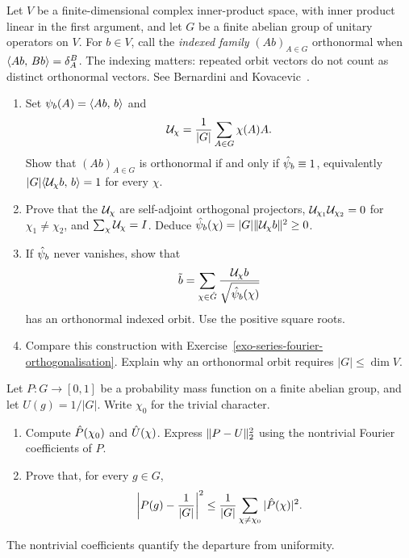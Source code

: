 
\begin{exo}
\label{exo-orthogonalization-abelian-group}
Let $V$ be a finite-dimensional complex inner-product space, with inner
product linear in the first argument, and let $G$ be a finite abelian group
of unitary operators on $V$. For $b\in V$, call the \emph{indexed family}
$(Ab)_{A\in G}$ orthonormal when $\langle Ab,\,Bb\rangle=\delta_A^B$.
The indexing matters: repeated orbit vectors do not count as distinct
orthonormal vectors. See Bernardini and Kovacevic~\cite{bernardini-orthogonalisation-1}.
\begin{enumerate}
\item Set $\psi_b(A)=\langle Ab,\,b\rangle$ and
\[
 \mathcal{U}_\chi=\frac1{|G|}\sum_{A\in G}\chi(A)A.
\]
Show that $(Ab)_{A\in G}$ is orthonormal if and only if
$\hat{\psi}_b\equiv1$, equivalently
$|G|\langle \mathcal{U}_\chi b,\,b\rangle=1$ for every $\chi$.
\item Prove that the $\mathcal{U}_\chi$ are self-adjoint orthogonal projectors,
$\mathcal{U}_{\chi_1}\mathcal{U}_{\chi_2}=0$ for $\chi_1\neq\chi_2$, and
$\sum_\chi\mathcal{U}_\chi=I$. Deduce
$\hat{\psi}_b(\chi)=|G|\lVert\mathcal{U}_\chi b\rVert^2\geq0$.
\item If $\hat{\psi}_b$ never vanishes, show that
\[
 \tilde{b}=\sum_{\chi\in\hat{G}}
       \frac{\mathcal{U}_\chi b}{\sqrt{\hat{\psi}_b(\chi)}}
\]
has an orthonormal indexed orbit. Use the positive square roots.
\item Compare this construction with
Exercise~\ref{exo-series-fourier-orthogonalisation}. Explain why an orthonormal
orbit requires $|G|\leq\dim V$.
\end{enumerate}
\end{exo}


\begin{exo}
\label{exo-repartition-proba}
Let $P:G\to[0,1]$ be a probability mass function on a finite abelian group,
and let $U(g)=1/|G|$. Write $\chi_0$ for the trivial character.
\begin{enumerate}
\item Compute $\hat{P}(\chi_0)$ and $\hat{U}(\chi)$. Express
$\lVert P-U\rVert_2^2$ using the nontrivial Fourier coefficients of $P$.
\item Prove that, for every $g\in G$,
\[
 \left|P(g)-\frac1{|G|}\right|^2
 \leq\frac1{|G|}\sum_{\chi\neq\chi_0}|\hat{P}(\chi)|^2.
\]
\end{enumerate}
The nontrivial coefficients quantify the departure from uniformity.
\end{exo}

